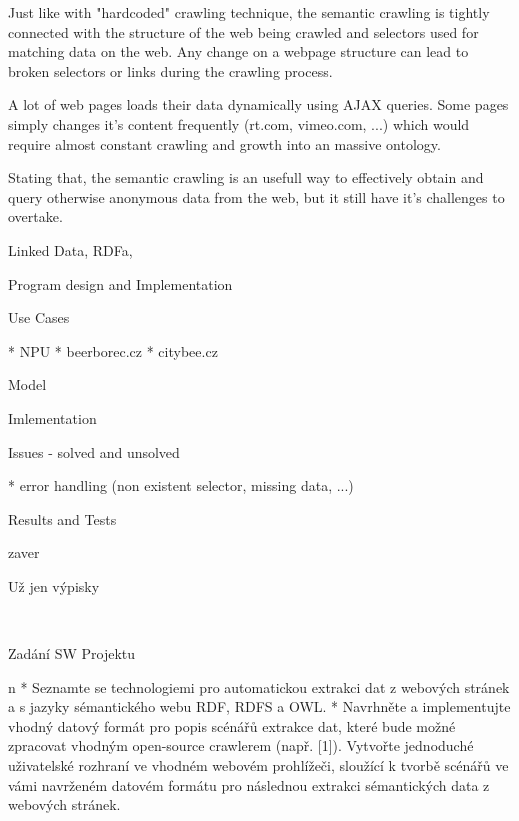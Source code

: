 Just like with "hardcoded" crawling technique, the semantic crawling is tightly
connected with the structure of the web being crawled and selectors used for
matching data on the web. Any change on a webpage structure can lead to broken
selectors or links during the crawling process. 

A lot of web pages loads their data dynamically using AJAX queries. Some pages
simply changes it's content frequently (rt.com, vimeo.com, ...) which would
require almost constant crawling and growth into an massive ontology. 

Stating that, the semantic crawling is an usefull way to effectively obtain and
query otherwise anonymous data from the web, but it still have it's challenges
to overtake. 


\chap Linked Data, RDFa, 

\chap Program design and Implementation

\sec Use Cases

\begitems
  * NPU
  * beerborec.cz
  * citybee.cz
\enditems

\sec Model

\sec Imlementation

\sec Issues - solved and unsolved

\begitems
  * error handling (non existent selector, missing data, ...)
\enditems


\chap Results and Tests 

\chap zaver




















\chap Už jen výpisky

~


\chap Zadání SW Projektu

\begitems \style n
  * Seznamte se technologiemi pro automatickou extrakci dat z webových stránek
    a s jazyky sémantického webu RDF, RDFS a OWL.
  * Navrhněte a implementujte vhodný datový formát pro popis scénářů extrakce
    dat, které bude možné zpracovat vhodným open-source crawlerem (např.  [1]).
    Vytvořte jednoduché uživatelské rozhraní ve vhodném webovém prohlížeči,
    sloužící k tvorbě scénářů ve vámi navrženém datovém formátu pro následnou
    extrakci sémantických data z webových stránek. 
\enditems







